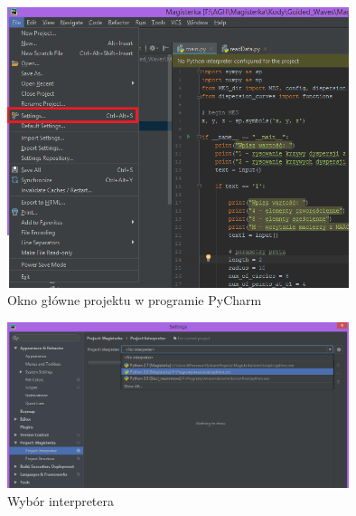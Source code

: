 \begin{figure}[h]
\centering
\includegraphics[width=10cm]{Zdjecia/5/pycharm1}
\caption{Okno główne projektu w programie PyCharm}
\label{fig:pycharm1}
\end{figure}

\begin{figure}[h]
\centering
\includegraphics[width=10cm]{Zdjecia/5/pycharm2}
\caption{Wybór interpretera}
\label{fig:pycharm2}
\end{figure}










